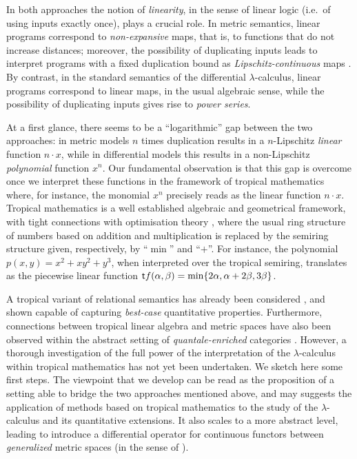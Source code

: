 \documentclass[submission,%
]{eptcs}
\begin{document}
In both approaches the notion of \emph{linearity}, in the sense of linear logic \cite{girardLl} (i.e.~of using inputs exactly once), plays a crucial role.
In metric semantics, linear programs correspond to \emph{non-expansive} maps, that is, to functions that do not increase distances; moreover, the possibility of duplicating inputs leads to interpret programs with a fixed duplication bound as \emph{Lipschitz-continuous} maps \cite{Gaboardi2017}.
By contrast, in the standard semantics of the differential $\lambda$-calculus, linear programs correspond to linear maps, in the usual algebraic sense, while the possibility of duplicating inputs gives rise to \emph{power series}.

At a first glance, there seems to be a  ``logarithmic'' gap between the two approaches:
in metric models $n$ times duplication results in a $n$-Lipschitz \emph{linear} function $n\cdot x$, while in differential models this results in a non-Lipschitz \emph{polynomial} function $x^{n}$.
Our fundamental observation is that 
this gap is overcome once we interpret these functions in the framework of tropical mathematics where, for instance, the monomial $x^{n}$ precisely reads as the linear function $n\cdot x$.
Tropical mathematics \cite{Simon} is a well established algebraic and geometrical framework, with tight connections with optimisation theory \cite{Sturmfelds}, where the usual ring structure of numbers based on addition and multiplication is replaced by the semiring structure given, respectively, by ``$\min$'' and ``$+$''.
For instance, the polynomial $p(x,y)=x^{2}+xy^{2}+y^{3}$, when interpreted over the tropical semiring, translates as the piecewise linear function
$
\mathsf{t} f(\alpha,\beta)=\min\{2\alpha, \alpha+2\beta, 3\beta\}
$.

A tropical variant of relational semantics has already been considered \cite{Manzo2013}, and shown capable of capturing \emph{best-case} quantitative properties.
Furthermore, connections between tropical linear algebra and metric spaces have also been observed \cite{Fuji} within the abstract setting of \emph{quantale-enriched} categories \cite{Hofmann2014, Stubbe2014}.
However, a thorough investigation of the full power of the interpretation of the $\lambda$-calculus within tropical mathematics has not yet been undertaken.
We sketch here some first steps.
The viewpoint that we develop can be read as the proposition of a setting able to bridge the two approaches mentioned above, and may suggests the application of methods based on tropical mathematics to the study of the $\lambda$-calculus and its quantitative extensions.
It also scales to a 
more abstract level, leading to introduce a differential operator for continuous functors between \emph{generalized} metric spaces (in the sense of \cite{Lawvere1973}).
\end{document}
